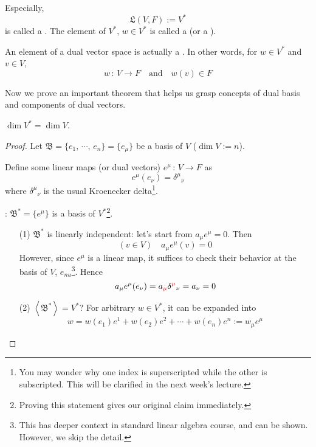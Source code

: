 \documentclass[a4paper, 10pt]{article}
\begin{document}
\begin{definition}
    Especially,
    \[ \mathfrak{L}(V, F) := V^{\ast} \]
    is called a . The element of $V^{\ast}$, $w \in V^{\ast}$ is called a  (or a ).
\end{definition}
\begin{remark}
    An element of a dual vector space is actually a . In other words, for $w \in V^{\ast}$ and $v \in V$,
    \[ w \,:\, V \rightarrow F \quad \text{and} \quad w(v) \in F \]
\end{remark}
Now we prove an important theorem that helps us grasp concepts of dual basis and components of dual vectors.
\begin{theorem}
    $\dim V^{\ast} = \dim V$.
\end{theorem}
\begin{proof}
    Let $\mathfrak{B} = \{e_{1} ,\, \cdots ,\, e_{n} \} = \{ e_{\mu} \}$ be a basis of $V$ ($\dim V := n$).

    Define some linear maps (or dual vectors) $e^{\mu} \,:\, V \rightarrow F$ as
    \[ e^{\mu}(e_{\nu}) = \delta^{\mu}{}_{\nu} \]
    where $\delta^{\mu}{}_{\nu}$ is the usual Kroenecker delta\footnote{You may wonder why one index is superscripted while the other is subscripted. This will be clarified in the next week's lecture.}.

    : $\mathfrak{B}^{\ast} = \{ e^{\mu} \}$ is a basis of $V^{\ast}$\footnote{Proving this statement gives our original claim immediately.}.
    \begin{itemize}
        \item[(1)] $\mathfrak{B}^{\ast}$ is linearly independent: let's start from $a_{\mu}e^{\mu} = 0$. Then
        \[ (v \in V) \quad a_{\mu} e^{\mu}(v) = 0 \]
        However, since $e^{\mu}$ is a linear map, it suffices to check their behavior at the basis of $V$, $e_{nu}$\footnote{This has deeper context in standard linear algebra course, and can be shown. However, we skip the detail.}. Hence
        \[ a_{\mu} e^{\mu}(e_{\nu}) = a_{\textcolor{red}{\mu}}\delta^{\textcolor{red}{\mu}}{}_{\nu} = a_{\nu} = 0 \]
        \item[(2)] $\left<\mathfrak{B}^{\ast}\right> = V^{\ast}$? For arbitrary $w \in V^{\ast}$, it can be expanded into
        \[ w = w(e_{1})e^{1} + w(e_{2})e^{2} + \cdots + w(e_{n})e^{n} := w_{\mu}e^{\mu} \]
    \end{itemize}
\end{proof}
\newpage
\end{document}
